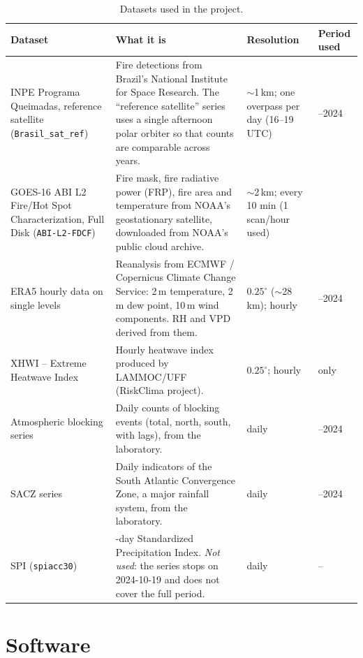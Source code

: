 \documentclass[11pt,a4paper,oneside]{report}
\newcommand{\code}[1]{\texttt{\small #1}}
\begin{document}
\begin{table}[H]
\centering\small
\caption{Datasets used in the project.}
\label{tab:datasets}
\begin{tabularx}{\linewidth}{>{\raggedright\arraybackslash}p{3.3cm} >{\raggedright\arraybackslash}X >{\raggedright\arraybackslash}p{2.4cm} >{\raggedright\arraybackslash}p{2.2cm}}
\toprule
\textbf{Dataset} & \textbf{What it is} & \textbf{Resolution} & \textbf{Period used} \\
\midrule
INPE Programa Queimadas, reference satellite (\code{Brasil\_sat\_ref}) &
Fire detections from Brazil's National Institute for Space Research. The
\enquote{reference satellite} series uses a single afternoon polar orbiter so
that counts are comparable across years. &
$\sim$1\,km; one overpass per day (16--19\,UTC) & 2019--2024 \\
\addlinespace
GOES-16 ABI L2 Fire/Hot Spot Characterization, Full Disk (\code{ABI-L2-FDCF}) &
Fire mask, fire radiative power (FRP), fire area and temperature from NOAA's
geostationary satellite, downloaded from NOAA's public cloud archive. &
$\sim$2\,km; every 10 min (1 scan/hour used) & 2024 \\
\addlinespace
ERA5 hourly data on single levels &
Reanalysis from ECMWF / Copernicus Climate Change Service: 2\,m temperature,
2\,m dew point, 10\,m wind components. RH and VPD derived from them. &
$0.25^\circ$ ($\sim$28\,km); hourly & 2019--2024 \\
\addlinespace
XHWI -- Extreme Heatwave Index & Hourly heatwave index produced by LAMMOC/UFF
(RiskClima project). & $0.25^\circ$; hourly & 2024 only \\
\addlinespace
Atmospheric blocking series & Daily counts of blocking events (total, north,
south, with lags), from the laboratory. & daily & 2019--2024 \\
\addlinespace
SACZ series & Daily indicators of the South Atlantic Convergence Zone, a major
rainfall system, from the laboratory. & daily & 2019--2024 \\
\addlinespace
SPI (\code{spiacc30}) & 30-day Standardized Precipitation Index. \emph{Not used}:
the series stops on 2024-10-19 and does not cover the full period. & daily & -- \\
\bottomrule
\end{tabularx}
\end{table}

\section{Software}
\end{document}
